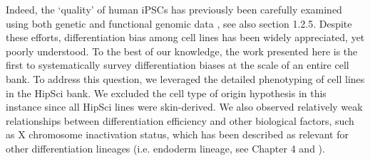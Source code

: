 Indeed, the `quality' of human iPSCs has previously been carefully examined using both genetic and functional genomic data \cite{muller2011bioinformatic, international2018assessment, tsankov2015qpcr, bock2011reference}, see also section
1.2.5. 
Despite these efforts, differentiation bias among cell lines has been widely appreciated, yet poorly understood. 
To the best of our knowledge, the work presented here is the first to systematically survey differentiation biases at the scale of an entire cell bank. 
To address this question, we leveraged the detailed phenotyping of cell lines in the HipSci bank.
We excluded the cell type of origin hypothesis \cite{hu2016effects} in this instance since all HipSci lines were skin-derived.
We also observed relatively weak relationships between differentiation efficiency and other biological factors, such as X chromosome inactivation status, which has been described as relevant for other differentiation lineages (i.e. endoderm lineage, see Chapter
4 and \cite{cuomo2020single}).
\\

